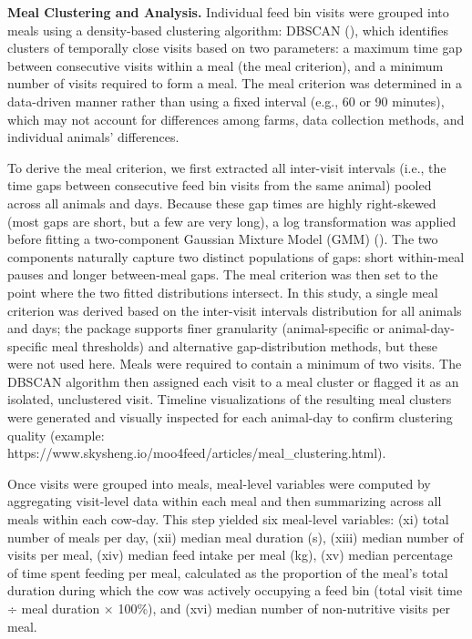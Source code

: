 \documentclass[
]{article}
\begin{document}
\textbf{Meal Clustering and Analysis.} Individual feed bin visits were
grouped into meals using a density-based clustering algorithm: DBSCAN
(), which identifies
clusters of temporally close visits based on two parameters: a maximum
time gap between consecutive visits within a meal (the meal criterion),
and a minimum number of visits required to form a meal. The meal
criterion was determined in a data-driven manner rather than using a
fixed interval (e.g., 60 or 90 minutes), which may not account for
differences among farms, data collection methods, and individual
animals' differences.

To derive the meal criterion, we first extracted all inter-visit
intervals (i.e., the time gaps between consecutive feed bin visits from
the same animal) pooled across all animals and days. Because these gap
times are highly right-skewed (most gaps are short, but a few are very
long), a log transformation was applied before fitting a two-component
Gaussian Mixture Model (GMM) (). The two components naturally capture two distinct
populations of gaps: short within-meal pauses and longer between-meal
gaps. The meal criterion was then set to the point where the two fitted
distributions intersect. In this study, a single meal criterion was
derived based on the inter-visit intervals distribution for all animals
and days; the package supports finer granularity (animal-specific or
animal-day-specific meal thresholds) and alternative gap-distribution
methods, but these were not used here. Meals were required to contain a
minimum of two visits. The DBSCAN algorithm then assigned each visit to
a meal cluster or flagged it as an isolated, unclustered visit. Timeline
visualizations of the resulting meal clusters were generated and
visually inspected for each animal-day to confirm clustering quality
(example:
https://www.skysheng.io/moo4feed/articles/meal\_clustering.html).

Once visits were grouped into meals, meal-level variables were computed
by aggregating visit-level data within each meal and then summarizing
across all meals within each cow-day. This step yielded six meal-level
variables: (xi) total number of meals per day, (xii) median meal
duration (s), (xiii) median number of visits per meal, (xiv) median feed
intake per meal (kg), (xv) median percentage of time spent feeding per
meal, calculated as the proportion of the meal's total duration during
which the cow was actively occupying a feed bin (total visit time ÷ meal
duration × 100\%), and (xvi) median number of non-nutritive visits per
meal.
\end{document}
